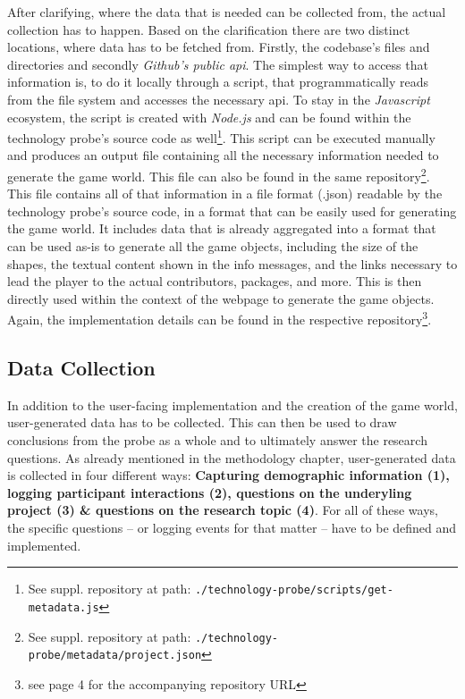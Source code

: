 After clarifying, where the data that is needed can be collected from, the actual collection has to happen. Based on the clarification there are two distinct locations, where data has to be fetched from. Firstly, the codebase's files and directories and secondly \textit{Github's public \gls{api}}. The simplest way to access that information is, to do it locally through a script, that programmatically reads from the file system and accesses the necessary \gls{api}. To stay in the \textit{Javascript} ecosystem, the script is created with \textit{Node.js} and can be found within the technology probe's source code as well\footnote{See suppl. repository at path: \texttt{./technology-probe/scripts/get-metadata.js}}. This script can be executed manually and produces an output file containing all the necessary information needed to generate the game world. This file can also be found in the same repository\footnote{See suppl. repository at path: \texttt{./technology-probe/metadata/project.json}}. This file contains all of that information in a file format (.json) readable by the technology probe's source code, in a format that can be easily used for generating the game world. It includes data that is already aggregated into a format that can be used as-is to generate all the game objects, including the size of the shapes, the textual content shown in the info messages, and the links necessary to lead the player to the actual contributors, packages, and more. This is then directly used within the context of the webpage to generate the game objects. Again, the implementation details can be found in the respective repository\footnote{see page 4 for the accompanying repository URL}.

\subsection{Data Collection}

In addition to the user-facing implementation and the creation of the game world, user-generated data has to be collected. This can then be used to draw conclusions from the probe as a whole and to ultimately answer the research questions. As already mentioned in the methodology chapter, user-generated data is collected in four different ways: \textbf{Capturing demographic information (1), logging participant interactions (2), questions on the underyling project (3) \& questions on the research topic (4)}. For all of these ways, the specific questions -- or logging events for that matter -- have to be defined and implemented.

